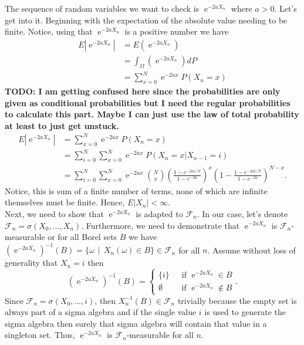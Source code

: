 \documentclass[10pt]{amsart}
\DeclareMathOperator{\E}{e}
\begin{document}
\noindent
The sequence of random variables we want to check is $\E^{-2 a X_n}$ where $a > 0$.
Let's get into it.
Beginning with the expectation of the absolute value needing to be finite.
Notice, using that $\E^{-2 a X_n}$ is a positive number we have
\begin{align*}
E \left| \E^{-2 a X_n} \right| &= E \left(\E^{-2 a X_n}\right) \\
	&= \int_\Omega \left(\E^{-2 a X_n}\right) d P \\
	&= \sum_{x = 0}^N \E^{-2 a x} P(X_n = x)
\end{align*}
\textbf{TODO: I am getting confused here since the probabilities are only given as conditional probabilities but I need the regular probabilities to calculate this part. Maybe I can just use the law of total probability at least to just get unstuck.}
\begin{align*}
E \left| \E^{-2 a X_n} \right| &= \sum_{x = 0}^N \E^{-2 a x} P(X_n = x) \\
	&= \sum_{i=0}^N \sum_{x = 0}^N \E^{-2 a x} P(X_n = x | X_{n-1} = i) \\
	&= \sum_{i=0}^N \sum_{x = 0}^N \E^{-2 a x} {N \choose x} \left( \frac{1-e^{-2ai/N}}{1-e^{-2a}} \right)^x \left(1-\frac{1-e^{-2ai/N}}{1-e^{-2a}} \right)^{N-x}.
\end{align*}
Notice, this is sum of a finite number of terms, none of which are infinite themselves must be finite.
Hence, $ E |X_n| < \infty. $ \\

\noindent
Next, we need to show that $\E^{-2 a X_n}$ is adapted to $\mathcal F_n$.
In our case, let's denote $\mathcal F_n = \sigma(X_0, ..., X_n)$.
Furthermore, we need to demonstrate that $\E^{-2 a X_n}$ is $\mathcal F_n$-measurable or for all Borel sets $B$ we have $\left( \E^{-2 a X_n}\right)^{-1}(B) = \{\omega \:\: | \:\: X_n(\omega) \in B\} \in \mathcal F_n$ for all $n$.
Assume without loss of generality that $X_n = i$ then 
$$
\left( \E^{-2 a X_n}\right)^{-1}(B) = \begin{cases}
\{ i \} \quad \, \text{ if } \E^{-2 a X_n} \in B \\
\emptyset \quad \quad \text{ if } \E^{-2 a X_n} \not\in B
\end{cases}.
$$
Since $\mathcal F_n = \sigma(X_0, ..., i)$, then $X_n^{-1}(B) \in \mathcal F_n$ trivially because the empty set is always part of a sigma algebra and if the single value $i$ is used to generate the sigma algebra then surely that sigma algebra will contain that value in a singleton set.
Thus, $\E^{-2 a X_n}$ is $\mathcal F_n$-measurable for all $n$. \\
\end{document}
